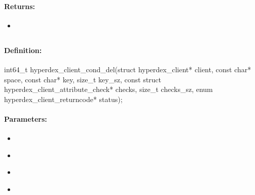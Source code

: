 \paragraph{Returns:}
\begin{itemize}[noitemsep]
\item {}\\

\end{itemize}

\pagebreak
\subsection{}
\label{api:c:cond_del}


\paragraph{Definition:}
\begin{ccode}
int64_t hyperdex_client_cond_del(struct hyperdex_client* client,
        const char* space,
        const char* key, size_t key_sz,
        const struct hyperdex_client_attribute_check* checks, size_t checks_sz,
        enum hyperdex_client_returncode* status);
\end{ccode}

\paragraph{Parameters:}
\begin{itemize}[noitemsep]
\item {}\\

\item {}\\

\item {}\\

\item {}\\

\end{itemize}

